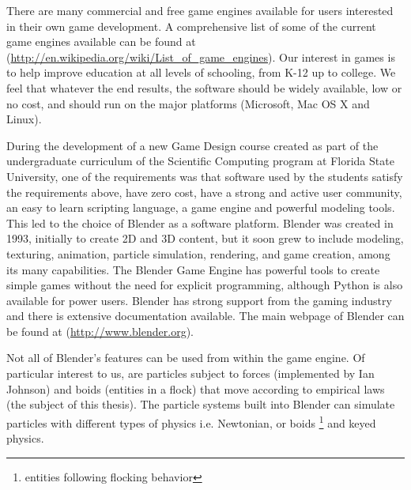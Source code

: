 


There are many commercial and free game engines available for users interested in their own game development. A comprehensive list of some of the current game engines available can be found at (\url{http://en.wikipedia.org/wiki/List\_of\_game\_engines}). Our interest in games is to help improve education at all levels of schooling, from K-12 up to college. We feel that whatever the end results, the software should be widely available, low or no cost, and should run on the major platforms (Microsoft, Mac OS X and Linux). 




During the development of a new Game Design course created as part of the undergraduate curriculum of the Scientific Computing program at Florida State University, one of the requirements was that software used by the students satisfy the requirements above, have zero cost, have a strong and active user community, an easy to learn scripting language, a game engine and powerful modeling tools. This led to the choice of Blender as a software platform. Blender was created in 1993, initially to create 2D and 3D content, but it soon grew to include modeling, texturing, animation, particle simulation, rendering, and game creation, among its many capabilities. The Blender Game Engine has powerful tools to create simple games without the need for explicit programming, although Python is also available for power users. Blender has strong support from the gaming industry and there is extensive documentation available. The main webpage of Blender can be found at (\url{http://www.blender.org}).  


Not all  of Blender's features can be used from within the game engine. Of particular 
interest to us, are particles subject to forces (implemented by Ian Johnson) and 
boids (entities in a flock) that move according to empirical laws (the subject of this
thesis). 
The particle systems built into Blender can simulate particles with different types of physics i.e. Newtonian, or boids \footnote{entities following flocking behavior} and keyed physics. 

